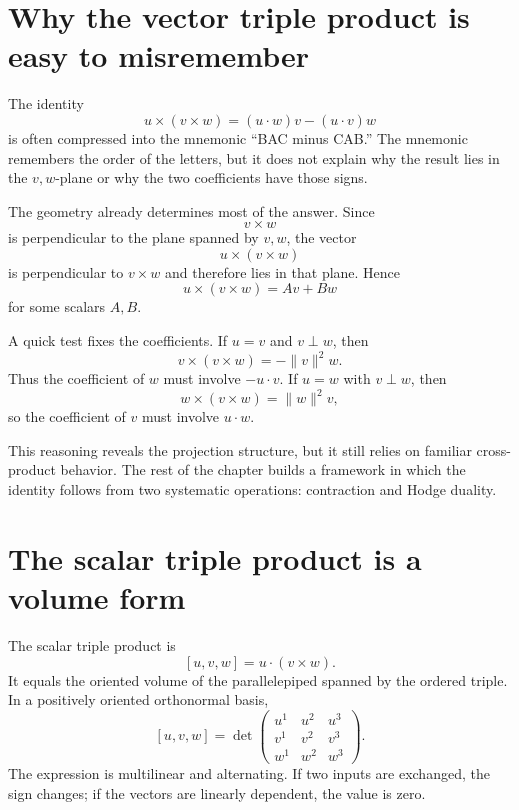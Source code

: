 
\section{Why the vector triple product is easy to misremember}

The identity
\[
  u\times(v\times w)
  =(u\cdot w)v-(u\cdot v)w
\]
is often compressed into the mnemonic ``BAC minus CAB.''  The mnemonic remembers the order of the letters, but it does not explain why the result lies in the \(v,w\)-plane or why the two coefficients have those signs.

The geometry already determines most of the answer.  Since
\[
  v\times w
\]
is perpendicular to the plane spanned by \(v,w\), the vector
\[
  u\times(v\times w)
\]
is perpendicular to \(v\times w\) and therefore lies in that plane.  Hence
\[
  u\times(v\times w)=Av+Bw
\]
for some scalars \(A,B\).

A quick test fixes the coefficients.  If \(u=v\) and \(v\perp w\), then
\[
  v\times(v\times w)=-\|v\|^2w.
\]
Thus the coefficient of \(w\) must involve \(-u\cdot v\).  If \(u=w\) with \(v\perp w\), then
\[
  w\times(v\times w)=\|w\|^2v,
\]
so the coefficient of \(v\) must involve \(u\cdot w\).

This reasoning reveals the projection structure, but it still relies on familiar cross-product behavior.  The rest of the chapter builds a framework in which the identity follows from two systematic operations: contraction and Hodge duality.

\section{The scalar triple product is a volume form}

The scalar triple product is
\[
  [u,v,w]=u\cdot(v\times w).
\]
It equals the oriented volume of the parallelepiped spanned by the ordered triple.  In a positively oriented orthonormal basis,
\[
  [u,v,w]
  =
  \det
  \begin{pmatrix}
    u^1&u^2&u^3\\
    v^1&v^2&v^3\\
    w^1&w^2&w^3
  \end{pmatrix}.
\]
The expression is multilinear and alternating.  If two inputs are exchanged, the sign changes; if the vectors are linearly dependent, the value is zero.

